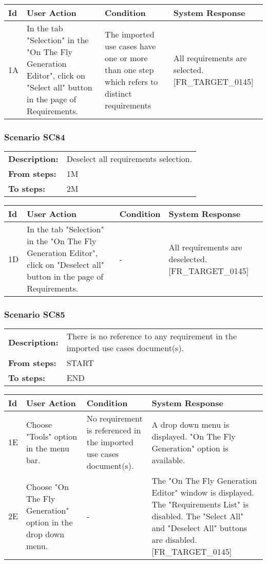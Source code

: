 \documentclass[a4paper,11pt]{article}
\newcommand{\bl}{\\ \hline}
\begin{document}
\begin{tabular}{|p{0.8in}|p{1.6in}|p{1.6in}|p{1.6in}|}
\hline
Id & User Action & Condition & System Response  \bl 
1A & In the tab "Selection" in the "On The Fly Generation
						Editor", click on "Select all" button in the page of Requirements.
					 & The imported use cases have one or more than one step
						which refers to distinct requirements & All requirements are selected. [FR_TARGET_0145]
					 \bl 
\end{tabular}
\subsubsection*{Scenario SC84}
\begin{tabular}{p{1in}p{4in}}
{\bf Description:} & Deselect all requirements selection. \\
{\bf From steps:} & 1M \\
{\bf To steps:} & 2M \\
\end{tabular}
 
\begin{tabular}{|p{0.8in}|p{1.6in}|p{1.6in}|p{1.6in}|}
\hline
Id & User Action & Condition & System Response  \bl 
1D & In the tab "Selection" in the "On The Fly Generation
						Editor", click on "Deselect all" button in the page of
						Requirements.  & - & All requirements are deselected. [FR_TARGET_0145]
					 \bl 
\end{tabular}
\subsubsection*{Scenario SC85}
\begin{tabular}{p{1in}p{4in}}
{\bf Description:} & There is no reference to any requirement in the
					imported use cases document(s). \\
{\bf From steps:} & START \\
{\bf To steps:} & END \\
\end{tabular}
 
\begin{tabular}{|p{0.8in}|p{1.6in}|p{1.6in}|p{1.6in}|}
\hline
Id & User Action & Condition & System Response  \bl 
1E & Choose "Tools" option in the menu bar.  & No requirement is referenced in the imported use cases
						document(s). & A drop down menu is displayed. "On The Fly Generation"
						option is available. \bl 
2E & Choose "On The Fly Generation" option in the drop down
						menu. & - & The "On The Fly Generation Editor" window is displayed.
						The "Requirements List" is disabled. The "Select All" and
						"Deselect All" buttons are disabled. [FR_TARGET_0145] \bl 
\end{tabular}
\end{document}
